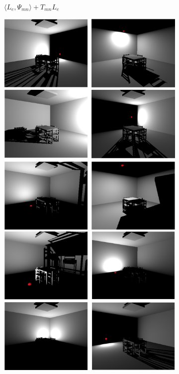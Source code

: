 \begin{figure}
\begin{center}
\begin{subfigure}[b]{0.38\textwidth}
		\caption{$\langle L_e,\Psi_{mn} \rangle+T_{mn}L_e$}
	\end{subfigure}
	\begin{subfigure}[b]{0.37\textwidth}
		\includegraphics[width=1.0\textwidth]{graphics/ir/ir-1-2}

\end{subfigure}
\end{center}
\end{figure}
